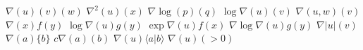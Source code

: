 \documentclass{article}
\begin{document}
$\nabla(u)(v)(w)$ $\nabla^{2}(u)(x)$ $\nabla\log(p)(q)$ $\log\nabla(u)(v)$ $\nabla(u,w)(v)$ $\nabla(x)f(y)$
$\log\nabla(u)g(y)$ $\exp\nabla(u)f(x)$ $\nabla\log\nabla(u)g(y)$ $\nabla|u|(v)$
$\nabla(a)\{b\}$ $c\nabla(a)(b)$ $\nabla(u)\langle a|b\rangle$ $\nabla(u)(>0)$
\end{document}
